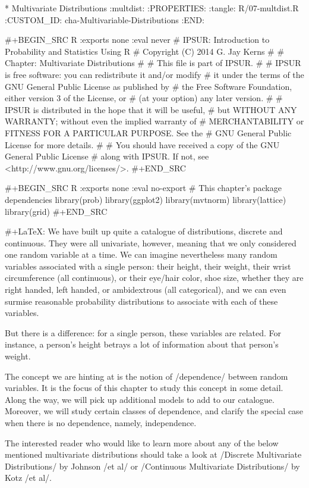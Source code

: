 * Multivariate Distributions                                       :multdist:
:PROPERTIES:
:tangle: R/07-multdist.R
:CUSTOM_ID: cha-Multivariable-Distributions
:END:

#+BEGIN_SRC R :exports none :eval never
#    IPSUR: Introduction to Probability and Statistics Using R
#    Copyright (C) 2014  G. Jay Kerns
#
#    Chapter: Multivariate Distributions
#
#    This file is part of IPSUR.
#
#    IPSUR is free software: you can redistribute it and/or modify
#    it under the terms of the GNU General Public License as published by
#    the Free Software Foundation, either version 3 of the License, or
#    (at your option) any later version.
#
#    IPSUR is distributed in the hope that it will be useful,
#    but WITHOUT ANY WARRANTY; without even the implied warranty of
#    MERCHANTABILITY or FITNESS FOR A PARTICULAR PURPOSE.  See the
#    GNU General Public License for more details.
#
#    You should have received a copy of the GNU General Public License
#    along with IPSUR.  If not, see <http://www.gnu.org/licenses/>.
#+END_SRC

#+BEGIN_SRC R :exports none :eval no-export
# This chapter's package dependencies
library(prob)
library(ggplot2)
library(mvtnorm)
library(lattice)
library(grid)
#+END_SRC

#+LaTeX: \noindent 
We have built up quite a catalogue of distributions, discrete and
continuous. They were all univariate, however, meaning that we only
considered one random variable at a time. We can imagine nevertheless
many random variables associated with a single person: their height,
their weight, their wrist circumference (all continuous), or their
eye/hair color, shoe size, whether they are right handed, left handed,
or ambidextrous (all categorical), and we can even surmise reasonable
probability distributions to associate with each of these variables.

But there is a difference: for a single person, these variables are
related. For instance, a person's height betrays a lot of information
about that person's weight.

The concept we are hinting at is the notion of /dependence/ between
random variables. It is the focus of this chapter to study this
concept in some detail. Along the way, we will pick up additional
models to add to our catalogue. Moreover, we will study certain
classes of dependence, and clarify the special case when there is no
dependence, namely, independence.

The interested reader who would like to learn more about any of the
below mentioned multivariate distributions should take a look at
/Discrete Multivariate Distributions/ by Johnson /et
al/\cite{Johnson1997} or /Continuous Multivariate Distributions/
\cite{Kotz2000} by Kotz /et al/.

